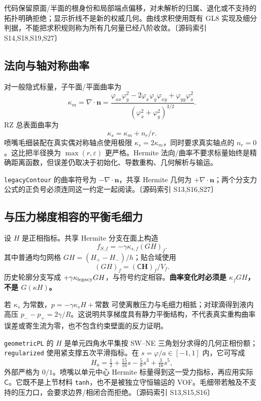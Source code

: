 \documentclass[UTF8,a4paper,11pt,fontset=fandol]{ctexart}
\newcommand{\code}[1]{\nolinkurl{#1}}
\newcommand{\src}[1]{\textcolor{ink}{\small〔源码索引 #1〕}}
\newcommand{\mat}[1]{\mathsf{#1}}
\begin{document}
代码保留原面/半面的根身份和局部端点偏移，对未解析的归属、退化或不支持的拓扑明确拒绝；显示折线不是新的权威几何。曲线求积使用既有 GL8 实现及细分判据，不能把求积规则称为所有几何量已经八阶收敛。\src{S14,S18,S19,S27}

\subsection{法向与轴对称曲率}
对一般隐式标量，子午面/平面曲率为
\begin{equation}
 \kappa_m=\nabla\cdot\bm n
 =\frac{\varphi_{xx}\varphi_y^2-2\varphi_x\varphi_y\varphi_{xy}+\varphi_{yy}\varphi_x^2}
 {(\varphi_x^2+\varphi_y^2)^{3/2}}.
\end{equation}
RZ 总表面曲率为
\begin{equation}
 \kappa_s=\kappa_m+n_r/r.
\end{equation}
喷嘴毛细装配在真实偶对称轴点使用极限 $\kappa_s=2\kappa_m$，同时要求真实轴点的 $n_r=0$。这比把半径换为 $\max(r,\varepsilon)$ 更严格。Hermite 法向/曲率不要求标量始终是精确距离函数，但误差仍取决于初始化、导数重构、几何解析与输运。

\code{legacyContour} 的曲率符号为 $-\nabla\cdot\bm n$，共享 Hermite 几何为 $+\nabla\cdot\bm n$；两个分支力公式的正负号必须连同这一约定一起阅读。\src{S13,S16,S27}

\subsection{与压力梯度相容的平衡毛细力}
设 $H$ 是正相指标。共享 Hermite 分支在面上构造
\begin{equation}
 f_{S,f}=-\gamma\kappa_{s,f}(G H)_f.\label{eq:capillary}
\end{equation}
其中普通均匀网格 $G H=(H_+-H_-)/h$；贴合域使用
\begin{equation}
 (GH)_f=(\mat C\bm H)_f/V_f.
\end{equation}
历史轮廓分支写成 $+\gamma\kappa_{\rm legacy}GH$，与符号约定相容。\textbf{曲率变化时必须是 $\kappa_f GH$，不是 $G(\kappa H)$。}

若 $\kappa_s$ 为常数，$p=-\gamma\kappa_s H+\text{常数}$ 可使离散压力与毛细力相抵；对球滴得到液内高压 $p_- - p_+=2\gamma/R$。这说明共享梯度具有静力平衡结构，不代表真实重构曲率误差或寄生流为零，也不包含约束壁面的反力证明。

\code{geometricPL} 的 $H$ 是单元四角水平集按 SW--NE 三角划分求得的几何正相份额；\code{regularized} 使用紧支撑五次平滑指标。在 $s=\varphi/a\in[-1,1]$ 内，它可写成
\begin{equation}
 H_a=\tfrac12+\tfrac{15}{16}s-\tfrac58s^3+\tfrac{3}{16}s^5,
\end{equation}
外部严格为 $0/1$。喷嘴以单元中心 Hermite 标量得到这一受力指标，再应用实际 $\mat C$。它既不是上节材料 \code{tanh}，也不是被独立守恒输运的 VOF。毛细带若触及不支持的压力口，会要求边界/相闭合而拒绝。\src{S13,S15,S16}
\end{document}
